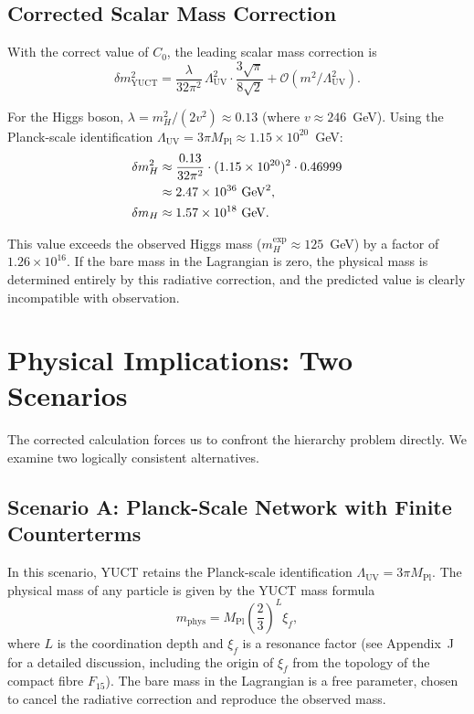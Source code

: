 \documentclass[12pt,a4paper]{article}
\newcommand{\Mpl}{M_{\mathrm{Pl}}}
\newcommand{\LUV}{\Lambda_{\mathrm{UV}}}
\theoremstyle{remark}
\begin{document}
	\subsection{Corrected Scalar Mass Correction}
	
	With the correct value of \(C_0\), the leading scalar mass correction is
	\begin{equation}
		\boxed{\delta m^2_{\mathrm{YUCT}} = \frac{\lambda}{32\pi^2}\,\LUV^2 \cdot \frac{3\sqrt{\pi}}{8\sqrt{2}} + \mathcal{O}(m^2/\LUV^2)}.
		\label{eq:scalar_corrected}
	\end{equation}
	
	For the Higgs boson, \(\lambda = m_H^2/(2v^2) \approx 0.13\) (where \(v \approx 246\)~GeV).  Using the Planck-scale identification \(\LUV = 3\pi\Mpl \approx 1.15\times 10^{20}\)~GeV:
	\begin{align}
		\delta m^2_H &\approx \frac{0.13}{32\pi^2} \cdot (1.15\times 10^{20})^2 \cdot 0.46999 \notag\\
		&\approx 2.47 \times 10^{36}\ \mathrm{GeV}^2, \notag\\
		\delta m_H &\approx 1.57 \times 10^{18}\ \mathrm{GeV}.
		\label{eq:planck_correction}
	\end{align}
	
	This value exceeds the observed Higgs mass (\(m_H^{\mathrm{exp}} \approx 125\)~GeV) by a factor of \(1.26 \times 10^{16}\).  If the bare mass in the Lagrangian is zero, the physical mass is determined entirely by this radiative correction, and the predicted value is clearly incompatible with observation.
	
	\section{Physical Implications: Two Scenarios}
	\label{sec:scenarios}
	
	The corrected calculation forces us to confront the hierarchy problem directly.  We examine two logically consistent alternatives.
	
	\subsection{Scenario A: Planck-Scale Network with Finite Counterterms}
	
	In this scenario, YUCT retains the Planck-scale identification \(\LUV = 3\pi\Mpl\).  The physical mass of any particle is given by the YUCT mass formula
	\begin{equation}
		m_{\mathrm{phys}} = \Mpl \left(\frac{2}{3}\right)^L \xi_f,
		\label{eq:mass_formula}
	\end{equation}
	where \(L\) is the coordination depth and \(\xi_f\) is a resonance factor (see Appendix~J for a detailed discussion, including the origin of \(\xi_f\) from the topology of the compact fibre \(F_{15}\)).  The bare mass in the Lagrangian is a free parameter, chosen to cancel the radiative correction and reproduce the observed mass.
	
\end{document}
